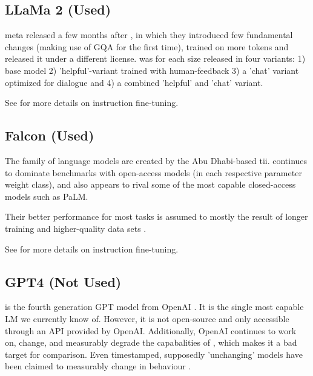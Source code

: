 \subsection{LLaMa 2 (Used)}\label{sub:llama2}
\gls{meta} released  \cite{touvron_llama2_2023} a few months after , in which they introduced few fundamental changes (making use of \gls{GQA} for the first time), trained on more tokens and released it under a different license.
 was for each size released in four variants: 1) base model 2) 'helpful'-variant trained with human-feedback 3) a 'chat' variant optimized for dialogue and 4) a combined 'helpful' and 'chat' variant.

See  for more details on instruction fine-tuning.

\subsection{Falcon (Used)}\label{sub:falcon}
The  \cite{zxhang_falcon_2023} family of language models are created by the Abu Dhabi-based \gls{tii}.
 continues to dominate benchmarks with open-access models (in each respective parameter weight class), and also appears to rival some of the most capable closed-access models such as \gls{PaLM}.

Their better performance for most tasks is assumed to mostly the result of longer training and higher-quality data sets \cite{zxhang_falcon_2023}.

See  for more details on instruction fine-tuning.

\subsection{GPT4 (Not Used)}\label{sub:GPT4}
 is the fourth generation \gls{GPT} model from \gls{OpenAI} \cite{openai_gpt4_2023}.
It is the single most capable \acrlong{LM} we currently know of.
However, it is not open-source and only accessible through an API provided by \gls{OpenAI}.
Additionally, \gls{OpenAI} continues to work on, change, and measurably degrade the capabalities \cite{chen_how_2023} of , which makes it a bad target for comparison.
Even timestamped, supposedly 'unchanging' models have been claimed to measurably change in behaviour \cite{jw1224_hn}.

